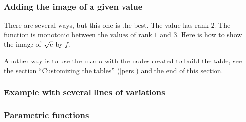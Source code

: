 \subsubsection{Adding the image of a given value}
There are several ways, but this one is the best. The value has rank $2$.
 The function is monotonic between the values of rank $1$ and $3$. Here is how to show the image of $\sqrt{\mathrm{e}}$ by $f$.

\begin{tkzexample}
\end{tkzexample}

Another way is to use the macro  with the nodes created to build the table; see the section ``Customizing the tables'' (\ref{pers}) and the end of this section.

\subsubsection{Example with several lines of variations}
\begin{tkzexample}
\end{tkzexample}


\subsubsection{Parametric functions}

